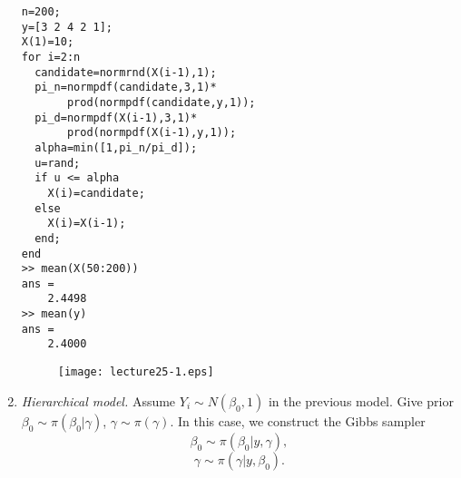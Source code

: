 \documentclass[11pt,twocolumn]{article} %
\begin{document}
\begin{enumerate}
\begin{verbatim}
n=200;
y=[3 2 4 2 1];
X(1)=10;
for i=2:n
  candidate=normrnd(X(i-1),1);
  pi_n=normpdf(candidate,3,1)*
       prod(normpdf(candidate,y,1));
  pi_d=normpdf(X(i-1),3,1)*
       prod(normpdf(X(i-1),y,1));
  alpha=min([1,pi_n/pi_d]);
  u=rand;
  if u <= alpha
    X(i)=candidate;
  else
    X(i)=X(i-1);
  end;
end
>> mean(X(50:200))
ans =
    2.4498
>> mean(y)
ans =
    2.4000
\end{verbatim}
\begin{figure}
\centering
\renewcommand{\baselinestretch}{1}
\texttt{[image: lecture25-1.eps]}
\end{figure}
\item {\em Hierarchical model.} Assume $Y_i \sim N(\beta_0,1)$ in
the previous model. Give prior $\beta_0 \sim \pi(\beta_0|\gamma)$,
$\gamma \sim \pi(\gamma)$. In this case, we construct the Gibbs
sampler
$$\beta_0 \sim \pi(\beta_0|y,\gamma),$$
$$\gamma \sim \pi(\gamma|y,\beta_0).$$
\end{enumerate}
\end{document}
